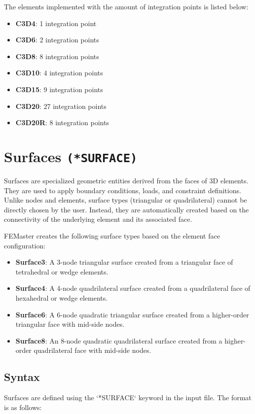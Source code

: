 The elements implemented with the amount of integration points is listed below:

\begin{itemize}
    \item \textbf{C3D4}: 1 integration point
    \item \textbf{C3D6}: 2 integration points
    \item \textbf{C3D8}: 8 integration points
    \item \textbf{C3D10}: 4 integration points
    \item \textbf{C3D15}: 9 integration points
    \item \textbf{C3D20}: 27 integration points
    \item \textbf{C3D20R}: 8 integration points
\end{itemize}


\newpage


\section{Surfaces \texttt{(*SURFACE)}}
Surfaces are specialized geometric entities derived from the faces of 3D elements. They are used to apply boundary conditions, loads, and constraint definitions. Unlike nodes and elements, surface types (triangular or quadrilateral) cannot be directly chosen by the user. Instead, they are automatically created based on the connectivity of the underlying element and its associated face.

FEMaster creates the following surface types based on the element face configuration:

\begin{itemize}
    \item \textbf{Surface3}: A 3-node triangular surface created from a triangular face of tetrahedral or wedge elements.
    \item \textbf{Surface4}: A 4-node quadrilateral surface created from a quadrilateral face of hexahedral or wedge elements.
    \item \textbf{Surface6}: A 6-node quadratic triangular surface created from a higher-order triangular face with mid-side nodes.
    \item \textbf{Surface8}: An 8-node quadratic quadrilateral surface created from a higher-order quadrilateral face with mid-side nodes.
\end{itemize}


\subsection{Syntax}
Surfaces are defined using the `*SURFACE` keyword in the input file. The format is as follows:

